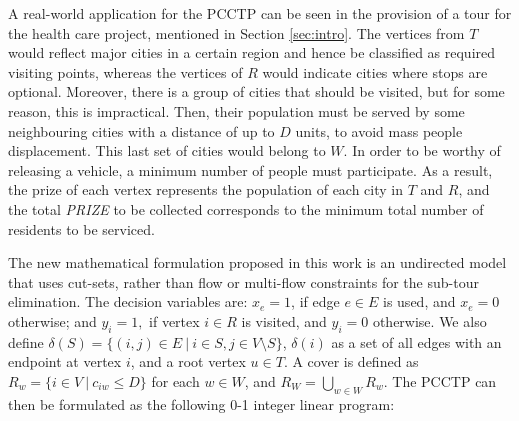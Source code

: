 \documentclass{singlecol-new}
\theoremstyle{TH}{
\newtheorem{lemma}{Lemma}
\newtheorem{theorem}[lemma]{Theorem}
\newtheorem{corrolary}[lemma]{Corrolary}
\newtheorem{conjecture}[lemma]{Conjecture}
\newtheorem{proposition}[lemma]{Proposition}
\newtheorem{claim}[lemma]{Claim}
\newtheorem{stheorem}[lemma]{Wrong Theorem}
}
\theoremstyle{THrm}{
\newtheorem{definition}{Definition}[section]
\newtheorem{question}{Question}[section]
\newtheorem{remark}{Remark}
\newtheorem{scheme}{Scheme}
}
\theoremstyle{THhit}{
\newtheorem{case}{Case}[section]
}
\begin{document}
A real-world application for the PCCTP can be seen in the provision of a tour for the health care project, mentioned in Section \ref{sec:intro}. The vertices from $T$ would reflect major cities in a certain region and hence be classified as required visiting points, whereas the vertices of $R$ would indicate cities where stops are optional. Moreover, there is a group of cities that should be visited, but for some reason, this is impractical. Then, their population must be served by some neighbouring cities with a distance of up to $D$ units, to avoid mass people displacement. This last set of cities would belong to $W$. In order to be worthy of releasing a vehicle, a minimum number of people must participate. As a result, the prize of each vertex represents the population of each city in $T$ and $R$, and the total \textit{PRIZE} to be collected corresponds to the minimum total number of residents to be serviced.


The new mathematical formulation proposed in this work is an undirected model that uses cut-sets, rather than flow \citep{lyra2004problema} or multi-flow \citep{silva2009problema} constraints for the sub-tour elimination. The decision variables are: $x_e =  1$, if edge  $e \in E$  is used, and 	$x_e=0$ otherwise; and  $y_i =  1,$ if vertex  $i \in R$ is visited, and $y_i=0$  otherwise.		We also define $\delta(S) = \{ (i,j) \in E \ | \ i \in S, j \in V \setminus S \}$, $\delta(i)$ as a set of all edges with an endpoint at vertex $i$, and a root vertex $u \in T$. A cover is defined as $R_w = \{ i \in V \ | \ c_{iw} \leq D \}$ for each $w \in W$, and $R_W = \bigcup_{w \in W} R_w$. The PCCTP can then be formulated as the following 0-1 integer linear program:
\end{document}
